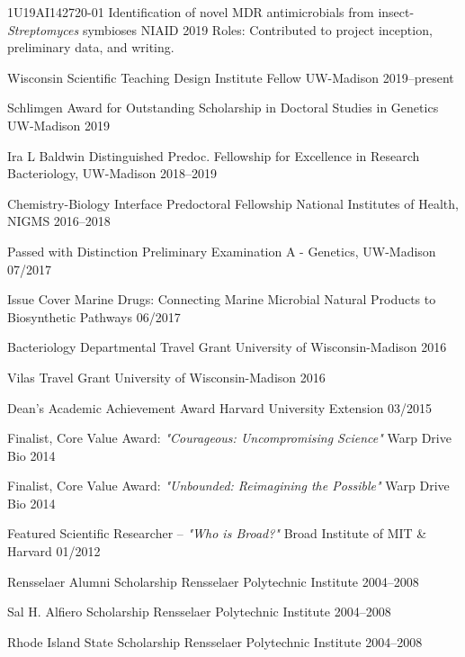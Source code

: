

\begin{cventries}

\cventry
{1U19AI142720-01}
{Identification of novel MDR antimicrobials from insect-\textit{Streptomyces} symbioses}
{NIAID}
{2019}
{Roles: Contributed to project inception, preliminary data, and writing.}

\end{cventries}

\begin{cvhonors}

\cvhonor
{Wisconsin Scientific Teaching Design Institute Fellow}
{UW-Madison}
{2019--present}

\cvhonor
{Schlimgen Award for Outstanding Scholarship in Doctoral Studies in Genetics}
{UW-Madison}
{2019}

\cvhonor
{Ira L Baldwin Distinguished Predoc. Fellowship for Excellence in Research}
{Bacteriology, UW-Madison}
{2018--2019}

\cvhonor
{Chemistry-Biology Interface Predoctoral Fellowship}
{National Institutes of Health, NIGMS}
{2016--2018}

\cvhonor
{Passed with Distinction}
{Preliminary Examination A - Genetics, UW-Madison}
{07/2017}

\cvhonor
{Issue Cover}
{Marine Drugs: Connecting Marine Microbial Natural Products to Biosynthetic Pathways}
{06/2017}

\cvhonor
{Bacteriology Departmental Travel Grant}
{University of Wisconsin-Madison}
{2016}

\cvhonor
{Vilas Travel Grant}
{University of Wisconsin-Madison}
{2016}

\cvhonor
{Dean's Academic Achievement Award}
{Harvard University Extension}
{03/2015}

\cvhonor
{Finalist, Core Value Award: \textit{"Courageous: Uncompromising Science"}}
{Warp Drive Bio}
{2014}

\cvhonor
{Finalist, Core Value Award: \textit{"Unbounded: Reimagining the Possible"}}
{Warp Drive Bio}
{2014}

\cvhonor
{Featured Scientific Researcher -- \textit{"Who is Broad?"}}
{Broad Institute of MIT \& Harvard}
{01/2012}

\cvhonor
{Rensselaer Alumni Scholarship}
{Rensselaer Polytechnic Institute}
{2004--2008}

\cvhonor
{Sal H. Alfiero Scholarship}
{Rensselaer Polytechnic Institute}
{2004--2008}

\cvhonor
{Rhode Island State Scholarship}
{Rensselaer Polytechnic Institute}
{2004--2008}

\end{cvhonors}
